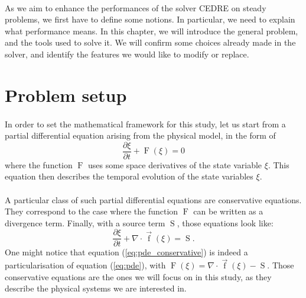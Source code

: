   \paragraph{}
  As we aim to enhance the performances of the solver CEDRE on steady problems, we first have to define some notions.
  In particular, we need to explain what performance means.
  In this chapter, we will introduce the general problem, and the tools used to solve it.
  We will confirm some choices already made in the solver, and identify the features we would like to modify or replace.

  \section{Problem setup}

    \paragraph{}
    In order to set the mathematical framework for this study, let us start from a partial differential equation arising from the physical model, in the form of
    \begin{equation}\label{eq:pde}
      \frac{\partial \xi}{\partial t} + \operatorname{F}\left(\xi\right) = 0
    \end{equation}
    where the function $\operatorname{F}$ uses some space derivatives of the state variable $\xi$.
    This equation then describes the temporal evolution of the state variables $\xi$.

    \paragraph{}
    A particular class of such partial differential equations are conservative equations.
    They correspond to the case where the function $\operatorname{F}$ can be written as a divergence term.
    Finally, with a source term $\operatorname{S}$, those equations look like:
    \begin{equation}\label{eq:pde_conservative}
      \frac{\partial \xi}{\partial t} + \nabla \cdot \vec{\operatorname{f}}\left(\xi\right) = \operatorname{S}.
    \end{equation}
    One might notice that equation (\ref{eq:pde_conservative}) is indeed a particularisation of equation (\ref{eq:pde}), with $\operatorname{F}\left(\xi\right) = \nabla\cdot \vec{\operatorname{f}}\left(\xi\right) - \operatorname{S}$.
    Those conservative equations are the ones we will focus on in this study, as they describe the physical systems we are interested in.


